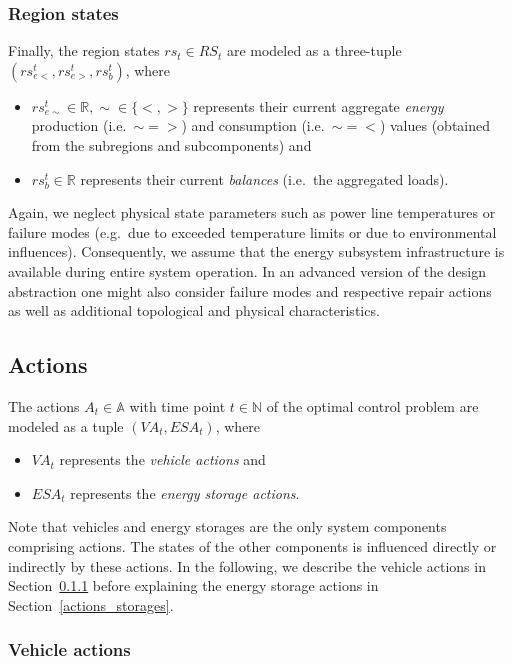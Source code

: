 \subsubsection{Region states}
\label{states_regions}
Finally, the region states $rs_t \in RS_t$ are modeled as a three-tuple $(rs_{e<}^t, rs_{e>}^t, rs_b^t)$, where
\begin{itemize}
	\item $rs_{e\sim}^t \in \mathbb{R}, \sim \in \{<,>\}$ represents their current aggregate \textit{energy} production (i.e.\ $\sim = >$) and consumption (i.e.\ $\sim = <$) values (obtained from the subregions and subcomponents) and
	\item $rs_b^t \in \mathbb{R}$ represents their current \textit{balances} (i.e.\ the aggregated loads).
\end{itemize}
Again, we neglect physical state parameters such as power line temperatures or failure modes (e.g.\ due to exceeded temperature limits or due to environmental influences). Consequently, we assume that the energy subsystem infrastructure is available during entire system operation. In an advanced version of the design abstraction one might also consider failure modes and respective repair actions~\cite{anghel2007stochastic} as well as additional topological and physical characteristics.

\subsection{Actions}
\label{actions}

The actions $A_t \in \mathbb{A}$ with time point $t \in \mathbb{N}$ of the optimal control problem are modeled as a tuple $(VA_t, ESA_t)$, where
\begin{itemize}
	\item $VA_t$ represents the \textit{vehicle actions} and
	\item $ESA_t$ represents the \textit{energy storage actions}.
\end{itemize}
Note that vehicles and energy storages are the only system components comprising actions. The states of the other components is influenced directly or indirectly by these actions. In the following, we describe the vehicle actions in Section~\ref{actions_vehicles} before explaining the energy storage actions in Section~\ref{actions_storages}.

\subsubsection{Vehicle actions}
\label{actions_vehicles}

